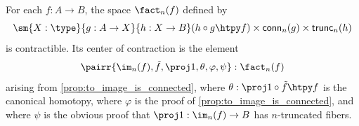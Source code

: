 %
\begin{thm}\label{thm:orth-fact}
For each $f:A\to B$, the space $\fact_n(f)$ defined by
\begin{equation*}
\sm{X:\type}{g:A\to X}{h:X\to B} (h\circ g\htpy f)\times\mathsf{conn}_n(g)\times\mathsf{trunc}_n(h)
\end{equation*}
is contractible.
Its center of contraction is the element
\begin{equation*}
\pairr{\im_n(f),\tilde{f},\proj1,\theta,\varphi,\psi}:\fact_n(f)
\end{equation*}
arising from \cref{prop:to_image_is_connected},
where $\theta:\proj1\circ\tilde{f}\htpy f$ is the canonical homotopy, where $\varphi$ is the proof of
\cref{prop:to_image_is_connected}, and where $\psi$ is the obvious proof that $\proj1:\im_n(f)\to B$ has $n$-truncated fibers.
\end{thm}

